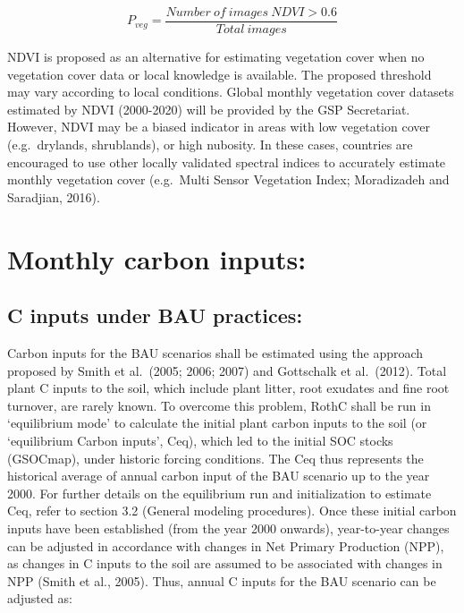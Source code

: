 \documentclass[
  10pt,
  b5paper,
]{book}
\begin{document}
\begin{equation}
\tag{6.3}
P_{veg} = \frac{Number\ of \ images \ NDVI > 0.6}{Total \ images}  
\end{equation}

NDVI is proposed as an alternative for estimating vegetation cover when no vegetation cover data or local knowledge is available. The proposed threshold may vary according to local conditions. Global monthly vegetation cover datasets estimated by NDVI (2000-2020) will be provided by the GSP Secretariat. However, NDVI may be a biased indicator in areas with low vegetation cover (e.g.~drylands, shrublands), or high nubosity. In these cases, countries are encouraged to use other locally validated spectral indices to accurately estimate monthly vegetation cover (e.g.~Multi Sensor Vegetation Index; Moradizadeh and Saradjian, 2016).

\hypertarget{monthly-carbon-inputs}{%
\section{Monthly carbon inputs:}\label{monthly-carbon-inputs}}

\hypertarget{c-inputs-under-bau-practices}{%
\subsection{C inputs under BAU practices:}\label{c-inputs-under-bau-practices}}

Carbon inputs for the BAU scenarios shall be estimated using the approach proposed by Smith et al.~(2005; 2006; 2007) and Gottschalk et al.~(2012). Total plant C inputs to the soil, which include plant litter, root exudates and fine root turnover, are rarely known. To overcome this problem, RothC shall be run in `equilibrium mode' to calculate the initial plant carbon inputs to the soil (or `equilibrium Carbon inputs', Ceq), which led to the initial SOC stocks (GSOCmap), under historic forcing conditions. The Ceq thus represents the historical average of annual carbon input of the BAU scenario up to the year 2000. For further details on the equilibrium run and initialization to estimate Ceq, refer to section 3.2 (General modeling procedures).
Once these initial carbon inputs have been established (from the year 2000 onwards), year-to-year changes can be adjusted in accordance with changes in Net Primary Production (NPP), as changes in C inputs to the soil are assumed to be associated with changes in NPP (Smith et al., 2005). Thus, annual C inputs for the BAU scenario can be adjusted as:
\end{document}
